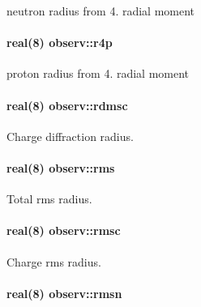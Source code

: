 neutron radius from 4. radial moment 

\paragraph[{\texorpdfstring{r4p}{r4p}}]{\setlength{\rightskip}{0pt plus 5cm}real(8) observ\+::r4p}\hypertarget{namespaceobserv_a923afbf28dd2bf131da354abbb1eb785}{}\label{namespaceobserv_a923afbf28dd2bf131da354abbb1eb785}


proton radius from 4. radial moment 

\paragraph[{\texorpdfstring{rdmsc}{rdmsc}}]{\setlength{\rightskip}{0pt plus 5cm}real(8) observ\+::rdmsc}\hypertarget{namespaceobserv_a3d24e28b38a8f944e6e335697a5819de}{}\label{namespaceobserv_a3d24e28b38a8f944e6e335697a5819de}


Charge diffraction radius. 

\paragraph[{\texorpdfstring{rms}{rms}}]{\setlength{\rightskip}{0pt plus 5cm}real(8) observ\+::rms}\hypertarget{namespaceobserv_a3b3964ead731eed696585a43d22b51f6}{}\label{namespaceobserv_a3b3964ead731eed696585a43d22b51f6}


Total rms radius. 

\paragraph[{\texorpdfstring{rmsc}{rmsc}}]{\setlength{\rightskip}{0pt plus 5cm}real(8) observ\+::rmsc}\hypertarget{namespaceobserv_a69b58be5538a0df79b7663fe1be07b10}{}\label{namespaceobserv_a69b58be5538a0df79b7663fe1be07b10}


Charge rms radius. 

\paragraph[{\texorpdfstring{rmsn}{rmsn}}]{\setlength{\rightskip}{0pt plus 5cm}real(8) observ\+::rmsn}\hypertarget{namespaceobserv_aa3dc1d3aead73ec11f1d86f5a069d302}{}\label{namespaceobserv_aa3dc1d3aead73ec11f1d86f5a069d302}


